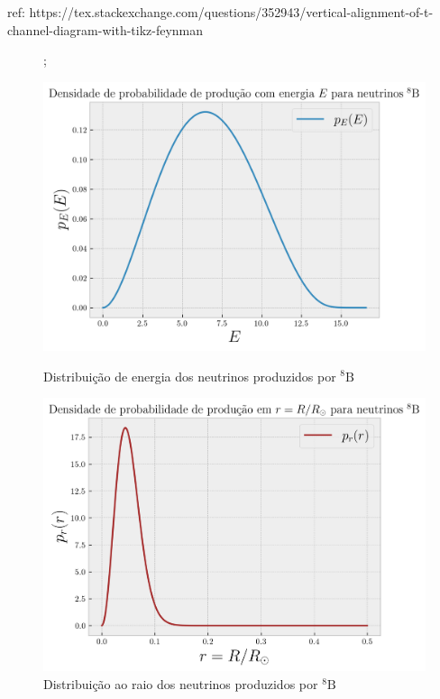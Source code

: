  ref: https://tex.stackexchange.com/questions/352943/vertical-alignment-of-t-channel-diagram-with-tikz-feynman
\begin{figure}[H]
    \centering
    ;
\end{figure}


\begin{figure}[H]
\centering
\begin{minipage}{.47\textwidth}
    \centering
    \includegraphics[width=\linewidth]{fig/nu8b-energy.png}
    \caption{Distribuição de energia dos neutrinos produzidos por $^8\text{B}$}
    \label{fig:nu8b-energy}
\end{minipage}
\hfill
\begin{minipage}{.47\textwidth}
    \centering
    \includegraphics[width=\linewidth]{fig/nu8b-raio.png}
    \caption{Distribuição ao raio dos neutrinos produzidos por $^8\text{B}$}
    \label{fig:nu8b-raio}
\end{minipage}
\end{figure}


